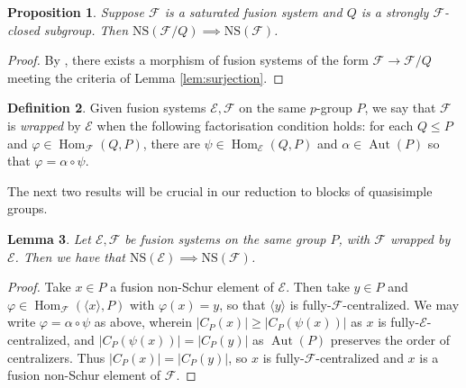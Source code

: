 \documentclass{amsart}
\theoremstyle{plain}\newtheorem{theorem}{Theorem}[section]
\theoremstyle{plain}\newtheorem{conjecture}[theorem]{Conjecture}
\theoremstyle{plain}\newtheorem{corollary}[theorem]{Corollary}
\theoremstyle{plain}\newtheorem{lemma}[theorem]{Lemma}
\theoremstyle{plain}\newtheorem{proposition}[theorem]{Proposition}
\theoremstyle{plain}\newtheorem{statement}[theorem]{}
\theoremstyle{definition}\newtheorem{definition}[theorem]{Definition}
\theoremstyle{definition}\newtheorem{example}[theorem]{Example}
\theoremstyle{definition}\newtheorem{examples}[theorem]{Examples}
\theoremstyle{definition}\newtheorem{notation}[theorem]{Notation}
\theoremstyle{definition}\newtheorem{remark}[theorem]{Remark}
\theoremstyle{definition}\newtheorem{remarks}[theorem]{Remarks}
\theoremstyle{definition}\newtheorem{question}[theorem]{Question}
\theoremstyle{definition}\newtheorem{propositiondefinition}[theorem]{Definition/Proposition}
\DeclareMathOperator{\Hom}{Hom}
\renewcommand{\phi}{\varphi}
\newcommand{\F}{\mathcal{F}}
\begin{document}
 \begin{proposition}\label{prop:quotient} Suppose $\mathcal{F}$ is a saturated fusion system and $Q$ is a strongly $\mathcal{F}$-closed subgroup. Then $\mathrm{NS}(\mathcal{F}/Q) \implies \mathrm{NS}(\mathcal{F})$.
 \end{proposition}
 \begin{proof} By \cite[Proposition 5.7, Theorem 5.14]{Craven}, there exists a morphism of fusion systems of the form $\mathcal{F} \rightarrow \mathcal{F}/Q$ meeting the criteria of Lemma \ref{lem:surjection}.
 \end{proof}
 \begin{definition}
	 Given fusion systems $\mathcal{E}, \mathcal{F}$ on the same $p$-group $P$, we say that $\mathcal{F}$ is \emph{wrapped} by $\mathcal{E}$ when the following factorisation condition holds: for each $Q \leq P$ and $\phi \in \Hom_\F(Q,P)$, there are $\psi \in \Hom_{\mathcal{E}}(Q,P)$ and $\alpha \in \operatorname{Aut}(P)$ so that $\phi = \alpha \circ \psi$.
\end{definition}
    The next two results will be crucial in our reduction to blocks of quasisimple groups.
 \begin{lemma}\label{lem:automorph}
	 Let $\mathcal{E}, \mathcal{F}$ be fusion systems on the same group $P$, with $\mathcal{F}$ wrapped by $\mathcal{E}$. Then we have that $\mathrm{NS}(\mathcal{E}) \implies \mathrm{NS}(\mathcal{F})$.
 \end{lemma}
 \begin{proof}
     Take $x \in P$ a fusion non-Schur element of $\mathcal{E}$. Then take $y \in P$ and $\phi \in \Hom_\F(\langle x \rangle, P)$ with $\phi(x) =y$, so that $\langle y \rangle$ is fully-$\mathcal{F}$-centralized. We may write $\phi = \alpha \circ \psi$ as above, wherein $|C_P(x)| \geq |C_P(\psi(x))|$ as $x$ is fully-$\mathcal{E}$-centralized, and $|C_P(\psi(x))| = |C_P(y)|$ as $\operatorname{Aut}(P)$ preserves the order of centralizers. Thus $|C_P(x)| = |C_P(y)|$, so $x$ is fully-$\mathcal{F}$-centralized and $x$ is a fusion non-Schur element of $\mathcal{F}$.
 \end{proof}
 
\end{document}
